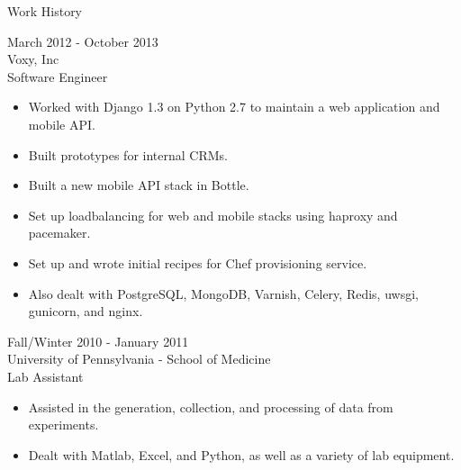 \documentclass[a4paper]{article}
\begin{document}
    \begin{Large}
        \noindent
        Work History
    \end{Large}
    \begingroup
    \fontsize{8pt}{12pt}\selectfont

    \begin{multicols}{2}
        \noindent
        March 2012 - October 2013 \\
        Voxy, Inc \\
        Software Engineer 
        \begin{itemize}
            \item Worked with Django 1.3 on Python 2.7 to maintain a web application and mobile API.
            \item Built prototypes for internal CRMs.
            \item Built a new mobile API stack in Bottle.
            \item Set up loadbalancing for web and mobile stacks using haproxy and pacemaker.
            \item Set up and wrote initial recipes for Chef provisioning service.
            \item Also dealt with PostgreSQL, MongoDB, Varnish, Celery, Redis, uwsgi, gunicorn, and nginx. 
        \end{itemize}
        \columnbreak
        Fall/Winter 2010 - January 2011 \\ 
        University of Pennsylvania - School of Medicine \\
        Lab Assistant
        \begin{itemize}
            \item Assisted in the generation, collection, and processing of data from experiments. 
            \item Dealt with Matlab, Excel, and Python, as well as a variety of lab equipment.
        \end{itemize}
    \end{multicols}
    \endgroup

    \begin{comment}
        Of Note \\
        \begin{tabular}{ m{3cm} m{3cm} m{3cm} m{8cm}}
            \hline  
            February 18, 2012 & Hacker Olympics & 2nd in Individual and 3rd in Team & Awesome. Best hackathon ever. Consisted of small, silly algorithmic and social engineering challenges. \\
            \hline
            April 20-21, 2010 & HackNY & 2nd (3rd really) & Great. Built beatmon, a social media traffic surge detector and resource swapper for low bandwidth sites, in python with the help of Raymond Ko. \\
            \hline
            January 2010 & PennApps & Did not place & Was a lot of fun. Worked on the Android mobile client for MobLaundry, a washer/dryer status API, as well as the HTML scraper (ugh) to pull data in for the API. \\
            \hline
        \end{tabular}
    \end{comment}
\end{document}
